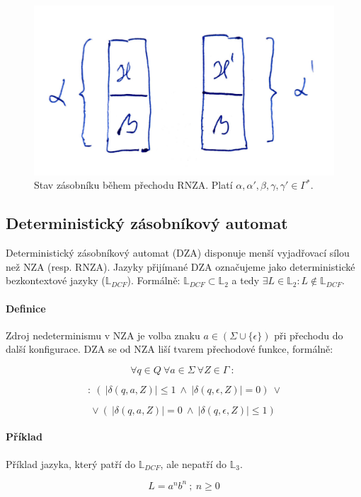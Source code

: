 \begin{figure}[H]
    \centering
    \includegraphics[width=0.35\linewidth]{rza_prechod_zasobnik.pdf}
    \caption{Stav zásobníku během přechodu RNZA. Platí $\alpha, \alpha', \beta, \gamma, \gamma' \in \Gamma^*$.}
\end{figure}

\subsection{Deterministický zásobníkový automat}

Deterministický zásobníkový automat (DZA) disponuje menší vyjadřovací sílou než NZA (resp. RNZA). Jazyky přijímané DZA označujeme jako deterministické bezkontextové jazyky ($\mathbb{L}_{DCF}$). Formálně: $\mathbb{L}_{DCF} \subset \mathbb{L}_2$ a tedy $\exists L \in \mathbb{L}_2 : L \not\in \mathbb{L}_{DCF}$.

\paragraph*{Definice} Zdroj nedeterminismu v NZA je volba znaku $a \in ( \Sigma \cup \{ \epsilon \} )$ při přechodu do další konfigurace. DZA se od NZA liší tvarem přechodové funkce, formálně:

$$ \forall q \in Q ~ \forall a \in \Sigma ~ \forall Z \in \Gamma ~:~ $$

$$ ~:~ ( ~ |\delta(q, a, Z)| \leq 1 ~\land~ | \delta(q, \epsilon, Z)| = 0 ) ~ \lor $$

$$ \lor ~ ( ~ |\delta(q, a, Z)| = 0 ~\land~ | \delta(q, \epsilon, Z)| \leq 1 ) $$

\paragraph*{Příklad} Příklad jazyka, který patří do $\mathbb{L}_{DCF}$, ale nepatří do $\mathbb{L}_{3}$.

$$L = a^n b^n ~;~ n \geq 0$$


